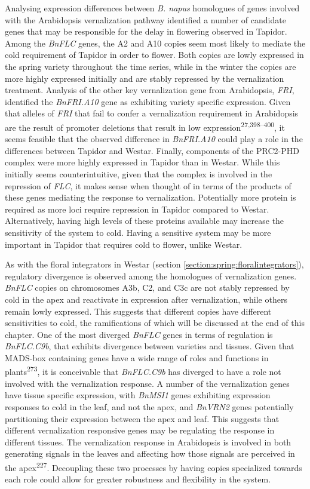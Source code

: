 \documentclass[12pt,]{book}
\begin{document}
Analysing expression differences between \emph{B. napus} homologues of
genes involved with the Arabidopsis vernalization pathway identified a
number of candidate genes that may be responsible for the delay in
flowering observed in Tapidor. Among the \emph{BnFLC} genes, the A2 and
A10 copies seem most likely to mediate the cold requirement of Tapidor
in order to flower. Both copies are lowly expressed in the spring
variety throughout the time series, while in the winter the copies are
more highly expressed initially and are stably repressed by the
vernalization treatment. Analysis of the other key vernalization gene
from Arabidopsis, \emph{FRI}, identified the \emph{BnFRI.A10} gene as
exhibiting variety specific expression. Given that alleles of \emph{FRI}
that fail to confer a vernalization requirement in Arabidopsis are the
result of promoter deletions that result in low
expression\textsuperscript{27,398--400}, it seems feasible that the
observed difference in \emph{BnFRI.A10} could play a role in the
differences between Tapidor and Westar. Finally, components of the
PRC2-PHD complex were more highly expressed in Tapidor than in Westar.
While this initially seems counterintuitive, given that the complex is
involved in the repression of \emph{FLC}, it makes sense when thought of
in terms of the products of these genes mediating the response to
vernalization. Potentially more protein is required as more loci require
repression in Tapidor compared to Westar. Alternatively, having high
levels of these proteins available may increase the sensitivity of the
system to cold. Having a sensitive system may be more important in
Tapidor that requires cold to flower, unlike Westar.

As with the floral integrators in Westar (section
\ref{section:spring:floralintegrators}), regulatory divergence is
observed among the homologues of vernalization genes. \emph{BnFLC}
copies on chromosomes A3b, C2, and C3c are not stably repressed by cold
in the apex and reactivate in expression after vernalization, while
others remain lowly expressed. This suggests that different copies have
different sensitivities to cold, the ramifications of which will be
discussed at the end of this chapter. One of the most diverged
\emph{BnFLC} genes in terms of regulation is \emph{BnFLC.C9b}, that
exhibits divergence between varieties and tissues. Given that MADS-box
containing genes have a wide range of roles and functions in
plants\textsuperscript{273}, it is conceivable that \emph{BnFLC.C9b} has
diverged to have a role not involved with the vernalization response. A
number of the vernalization genes have tissue specific expression, with
\emph{BnMSI1} genes exhibiting expression responses to cold in the leaf,
and not the apex, and \emph{BnVRN2} genes potentially partitioning their
expression between the apex and leaf. This suggests that different
vernalization responsive genes may be regulating the response in
different tissues. The vernalization response in Arabidopsis is involved
in both generating signals in the leaves and affecting how those signals
are perceived in the apex\textsuperscript{227}. Decoupling these two
processes by having copies specialized towards each role could allow for
greater robustness and flexibility in the system.
\end{document}
